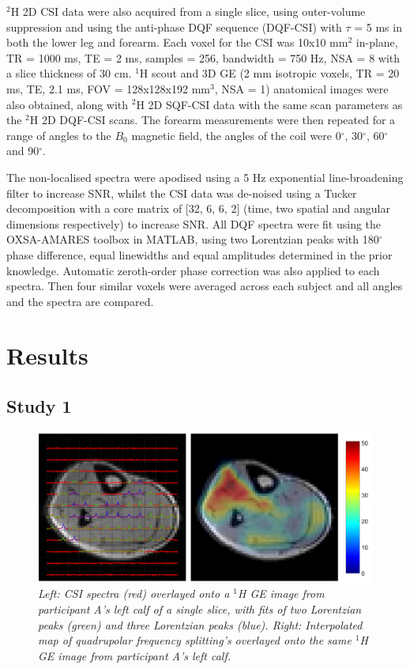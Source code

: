 \documentclass[class=article, crop=false]{standalone}
\begin{document}
$^2$H 2D CSI data were also acquired from a single slice, using outer-volume suppression and using the anti-phase DQF sequence (DQF-CSI) with $\tau$ = 5 ms in both the lower leg and forearm. Each voxel for the CSI was 10x10 mm$^2$ in-plane, TR = 1000 ms, TE = 2 ms, samples = 256, bandwidth = 750 Hz, NSA = 8 with a slice thickness of 30 cm. $^1$H scout and 3D GE (2 mm isotropic voxels, TR = 20 ms, TE, 2.1 ms, FOV = 128x128x192 mm$^3$, NSA = 1) anatomical images were also obtained, along with $^2$H 2D SQF-CSI data with the same scan parameters as the $^2$H 2D DQF-CSI scans. The forearm measurements were then repeated for a range of angles to the $B_0$ magnetic field, the angles of the coil were 0$^\circ$, 30$^\circ$, 60$^\circ$ and 90$^\circ$. 

The non-localised spectra were apodised using a 5 Hz exponential line-broadening filter to increase SNR, whilst the CSI data was de-noised using a Tucker decomposition \cite{Bader2007EfficientTensors} with a core matrix of [32, 6, 6, 2] (time, two spatial and angular dimensions respectively) to increase SNR. All DQF spectra were fit using the OXSA-AMARES \cite{Purvis2017OXSA:MATLAB} toolbox in MATLAB, using two Lorentzian peaks with 180$^\circ$ phase difference, equal linewidths and equal amplitudes determined in the prior knowledge. Automatic zeroth-order phase correction was also applied to each spectra. Then four similar voxels were averaged across each subject and all angles and the spectra are compared.

\section{Results}

\subsection{Study 1}

\begin{figure}
    \centering
    \includegraphics[width=1\textwidth]{Figures/Quad/Calf_A.png}
    \caption{\textit{Left: CSI spectra (red) overlayed onto a $^1$H GE image from participant A's left calf of a single slice, with fits of two Lorentzian peaks (green) and three Lorentzian peaks (blue). Right: Interpolated map of quadrupolar frequency splitting's overlayed onto the same $^1$H GE image from participant A's left calf.}}
    \label{fig:Quad:Calf_A}
\end{figure}
\end{document}
